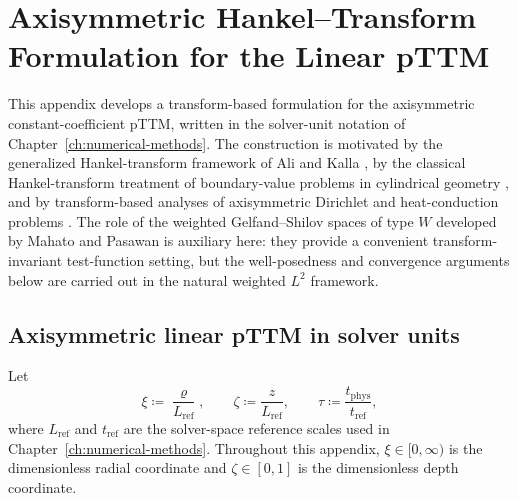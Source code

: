 \chapter{Axisymmetric Hankel--Transform Formulation for the Linear pTTM}
\label{app:axisym-hankel-linear-pttm}

This appendix develops a transform-based formulation for the axisymmetric
constant-coefficient pTTM, written in the solver-unit notation of Chapter~\ref{ch:numerical-methods}.
The construction is motivated by the generalized Hankel-transform framework of
Ali and Kalla \cite{Ali_Kalla_1999}, by the classical Hankel-transform
treatment of boundary-value problems in cylindrical geometry
\cite{Davies_2002_Hankel}, and by transform-based analyses of axisymmetric
Dirichlet and heat-conduction problems
\cite{Rogers_2012,Tuteja_Jaloree_Goyal_2014,Kunga_2021}.
The role of the weighted Gelfand--Shilov spaces of type \(W\) developed by
Mahato and Pasawan \cite{Mahato_Pasawan_2021} is auxiliary here: they provide
a convenient transform-invariant test-function setting, but the well-posedness
and convergence arguments below are carried out in the natural weighted
\(L^2\) framework.

\section{Axisymmetric linear pTTM in solver units}
\label{sec:appE-axisym-model}

Let
\begin{equation}
    \xi \coloneqq \frac{\varrho}{L_{\mathrm{ref}}},
    \qquad
    \zeta \coloneqq \frac{z}{L_{\mathrm{ref}}},
    \qquad
    \tau \coloneqq \frac{t_{\mathrm{phys}}}{t_{\mathrm{ref}}},
    \label{eq:appE-scaled-variables}
\end{equation}
where \(L_{\mathrm{ref}}\) and \(t_{\mathrm{ref}}\) are the solver-space
reference scales used in Chapter~\ref{ch:numerical-methods}.
Throughout this appendix, \(\xi\in[0,\infty)\) is the dimensionless radial
    coordinate and \(\zeta\in[0,1]\) is the dimensionless depth coordinate.

